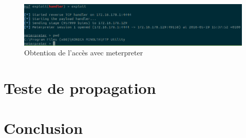     \begin{figure}[h!t]
        \centering
        \includegraphics[width=\linewidth]{images/meterpreter.png}
        \caption{Obtention de l'accès avec meterpreter}
        \label{obtention_accees_meterpreter}
    \end{figure}

\section{Teste de propagation}
\section{Conclusion}
